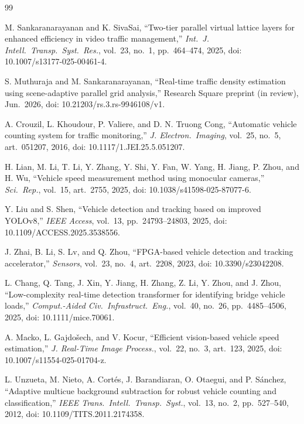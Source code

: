 \documentclass[conference]{IEEEtran}
\begin{document}
\begin{thebibliography}{99}

M. Sankaranarayanan and K. SivaSai, ``Two-tier parallel virtual lattice
layers for enhanced efficiency in video traffic management,''
\emph{Int.\ J. Intell.\ Transp.\ Syst.\ Res.}, vol.~23, no.~1,
pp.~464--474, 2025, doi: 10.1007/s13177-025-00461-4.

S. Muthuraja and M. Sankaranarayanan, ``Real-time traffic density
estimation using scene-adaptive parallel grid analysis,'' Research Square
preprint (in review), Jun.\ 2026, doi: 10.21203/rs.3.rs-9946108/v1.

A. Crouzil, L. Khoudour, P. Valiere, and D. N. Truong Cong, ``Automatic
vehicle counting system for traffic monitoring,'' \emph{J. Electron.\
Imaging}, vol.~25, no.~5, art.~051207, 2016, doi:
10.1117/1.JEI.25.5.051207.

H. Lian, M. Li, T. Li, Y. Zhang, Y. Shi, Y. Fan, W. Yang, H. Jiang,
P. Zhou, and H. Wu, ``Vehicle speed measurement method using monocular
cameras,'' \emph{Sci.\ Rep.}, vol.~15, art.~2755, 2025, doi:
10.1038/s41598-025-87077-6.

Y. Liu and S. Shen, ``Vehicle detection and tracking based on improved
YOLOv8,'' \emph{IEEE Access}, vol.~13, pp.~24793--24803, 2025, doi:
10.1109/ACCESS.2025.3538556.

J. Zhai, B. Li, S. Lv, and Q. Zhou, ``FPGA-based vehicle detection and
tracking accelerator,'' \emph{Sensors}, vol.~23, no.~4, art.~2208, 2023,
doi: 10.3390/s23042208.

L. Chang, Q. Tang, J. Xin, Y. Jiang, H. Zhang, Z. Li, Y. Zhou, and
J. Zhou, ``Low-complexity real-time detection transformer for identifying
bridge vehicle loads,'' \emph{Comput.-Aided Civ.\ Infrastruct.\ Eng.},
vol.~40, no.~26, pp.~4485--4506, 2025, doi: 10.1111/mice.70061.

A. Macko, L. Gajdo\v{s}ech, and V. Kocur, ``Efficient vision-based
vehicle speed estimation,'' \emph{J. Real-Time Image Process.}, vol.~22,
no.~3, art.~123, 2025, doi: 10.1007/s11554-025-01704-z.

L. Unzueta, M. Nieto, A. Cort\'es, J. Barandiaran, O. Otaegui, and
P. S\'anchez, ``Adaptive multicue background subtraction for robust
vehicle counting and classification,'' \emph{IEEE Trans.\ Intell.\
Transp.\ Syst.}, vol.~13, no.~2, pp.~527--540, 2012, doi:
10.1109/TITS.2011.2174358.


\end{thebibliography}
\end{document}
